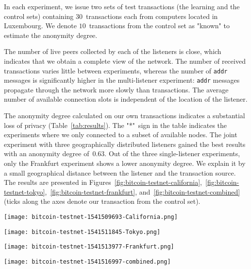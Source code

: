 In each experiment, we issue two sets of test transactions (the learning and the control sets) containing $30$~transactions each from computers located in Luxembourg.
We denote $10$~transactions from the control set as "known" to estimate the anonymity degree.

The number of live peers collected by each of the listeners is close, which indicates that we obtain a complete view of the network.
The number of received transactions varies little between experiments, whereas the number of \texttt{addr} messages is significantly higher in the multi-listener experiment: \texttt{addr} messages propagate through the network more slowly than transactions.
The average number of available connection slots is independent of the location of the listener.

The anonymity degree calculated on our own transactions indicates a substantial loss of privacy (Table~\ref{tab:results}).
The "*"~sign in the table indicates the experiments where we only connected to a subset of available nodes.
The joint experiment with three geographically distributed listeners gained the best results with an anonymity degree of~$0.63$.
Out of the three single-listener experiments, only the Frankfurt experiment shows a lower anonymity degree.
We explain it by a small geographical distance between the listener and the transaction source.
The results are presented in Figures~\ref{fig:bitcoin-testnet-california},~\ref{fig:bitcoin-testnet-tokyo},~\ref{fig:bitcoin-testnet-frankfurt}, and~\ref{fig:bitcoin-testnet-combined} (ticks along the axes denote our transaction from the control set).


\begin{figure*}
	\centering
	\begin{minipage}{0.5\textwidth}
		\centering
		\texttt{[image: bitcoin-testnet-1541509693-California.png]}
		\caption{Transaction clustering for Bitcoin testnet (listener in California).}
		\label{fig:bitcoin-testnet-california}
	\end{minipage}\hfill
	\begin{minipage}{0.5\textwidth}
		\centering
		\texttt{[image: bitcoin-testnet-1541511845-Tokyo.png]}
		\caption{Transaction clustering for Bitcoin testnet (listener in Tokyo).}
		\label{fig:bitcoin-testnet-tokyo}
	\end{minipage}\hfill
\end{figure*}

\begin{figure*}
	\centering
	\begin{minipage}{0.5\textwidth}
		\centering
		\texttt{[image: bitcoin-testnet-1541513977-Frankfurt.png]}
		\caption{Transaction clustering for Bitcoin testnet (listener in Frankfurt).}
		\label{fig:bitcoin-testnet-frankfurt}
	\end{minipage}\hfill
	\begin{minipage}{0.5\textwidth}
		\centering
		\texttt{[image: bitcoin-testnet-1541516997-combined.png]}
		\caption{Transaction clustering for Bitcoin testnet (combined listeners).}
		\label{fig:bitcoin-testnet-combined}
	\end{minipage}\hfill
\end{figure*}


